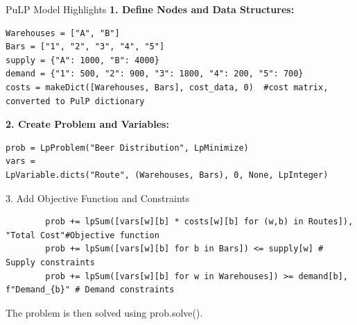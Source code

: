 \documentclass{purdue-slide}
\begin{document}

\begin{frame}[fragile]{PuLP Model Highlights}
	\textbf{1. Define Nodes and Data Structures:}
\begin{verbatim}
Warehouses = ["A", "B"]
Bars = ["1", "2", "3", "4", "5"]
supply = {"A": 1000, "B": 4000}
demand = {"1": 500, "2": 900, "3": 1800, "4": 200, "5": 700}
costs = makeDict([Warehouses, Bars], cost_data, 0)	#cost matrix, converted to PulP dictionary
\end{verbatim}

	\textbf{2. Create Problem and Variables:}
	\begin{verbatim}
prob = LpProblem("Beer Distribution", LpMinimize)
vars =
LpVariable.dicts("Route", (Warehouses, Bars), 0, None, LpInteger)
	\end{verbatim}
\end{frame}

\begin{frame}[fragile]{3. Add Objective Function and Constraints}
	\begin{verbatim}
		prob += lpSum([vars[w][b] * costs[w][b] for (w,b) in Routes]), "Total Cost"#Objective function
		prob += lpSum([vars[w][b] for b in Bars]) <= supply[w] # Supply constraints
		prob += lpSum([vars[w][b] for w in Warehouses]) >= demand[b], f"Demand_{b}" # Demand constraints
	\end{verbatim}
	The problem is then solved using prob.solve().
\end{frame}

\end{document}
